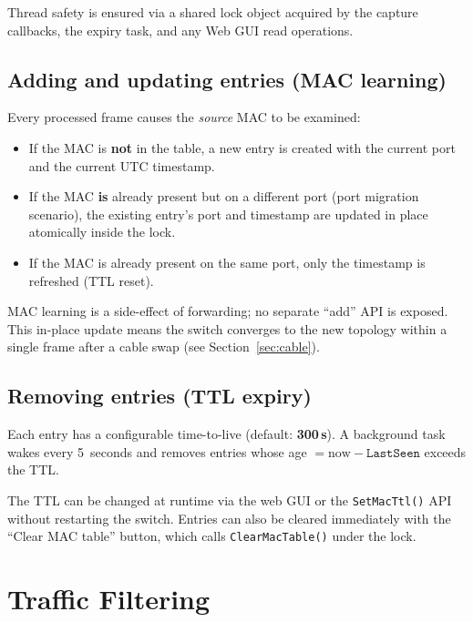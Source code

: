 \documentclass[12pt,a4paper]{article}
\begin{document}
Thread safety is ensured via a shared lock object acquired by the capture
callbacks, the expiry task, and any Web GUI read operations.

\subsection{Adding and updating entries (MAC learning)}

Every processed frame causes the \emph{source} MAC to be examined:

\begin{itemize}[noitemsep]
  \item If the MAC is \textbf{not} in the table, a new entry is created with
    the current port and the current UTC timestamp.
  \item If the MAC \textbf{is} already present but on a different port (port
    migration scenario), the existing entry's port and timestamp are updated
    in place atomically inside the lock.
  \item If the MAC is already present on the same port, only the timestamp
    is refreshed (TTL reset).
\end{itemize}

MAC learning is a side-effect of forwarding; no separate ``add'' API is
exposed.  This in-place update means the switch converges to the new topology
within a single frame after a cable swap (see Section~\ref{sec:cable}).

\subsection{Removing entries (TTL expiry)}

Each entry has a configurable time-to-live (default: \textbf{300\,s}).
A background task wakes every 5~seconds and removes entries whose age
$= \text{now} - \texttt{LastSeen}$ exceeds the TTL.

The TTL can be changed at runtime via the web GUI or the \texttt{SetMacTtl()}
API without restarting the switch.  Entries can also be cleared immediately
with the ``Clear MAC table'' button, which calls \texttt{ClearMacTable()} under
the lock.

\section{Traffic Filtering}
\label{sec:filtering}
\end{document}
